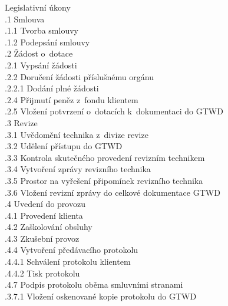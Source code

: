 \documentclass[a4paper, twoside, 11pt]{article}
\begin{document}
	 Legislativní úkony\\
		\indent {}.1 Smlouva\\
			\indent \indent {}.1.1 Tvorba smlouvy\\
			\indent \indent {}.1.2 Podepsání smlouvy\\
		\indent {}.2 Žádost o~dotace\\
			\indent \indent {}.2.1 Vypsání žádosti\\
			\indent \indent {}.2.2 Doručení žádosti příslušnému orgánu\\
			\indent \indent \indent {}.2.2.1 Dodání plné žádosti\\
			\indent \indent {}.2.4 Přijmutí peněz z~fondu klientem\\
			\indent \indent {}.2.5 Vložení potvrzení o~dotacích k~dokumentaci do GTWD\\
		\indent {}.3 Revize\\
			\indent \indent {}.3.1 Uvědomění technika z~divize revize\\
			\indent \indent {}.3.2 Udělení přístupu do GTWD\\
			\indent \indent {}.3.3 Kontrola skutečného provedení revizním technikem\\
			\indent \indent {}.3.4 Vytvoření zprávy revizního technika\\
			\indent \indent {}.3.5 Prostor na vyřešení připomínek revizního technika\\
			\indent \indent {}.3.6 Vložení revizní zprávy do celkové dokumentace GTWD\\

		\indent {}.4 Uvedení do provozu\\
			\indent \indent {}.4.1 Provedení klienta\\
			\indent \indent {}.4.2 Zaškolování obsluhy\\
			\indent \indent {}.4.3 Zkušební provoz\\
			\indent \indent {}.4.4 Vytvoření předávacího protokolu\\
			\indent \indent \indent {}.4.4.1 Schválení protokolu klientem\\
			\indent \indent \indent {}.4.4.2 Tisk protokolu\\
			\indent \indent {}.4.7 Podpis protokolu oběma smluvními stranami\\
			\indent \indent \indent {}.3.7.1 Vložení oskenované kopie protokolu do GTWD\\
		
\end{document}
